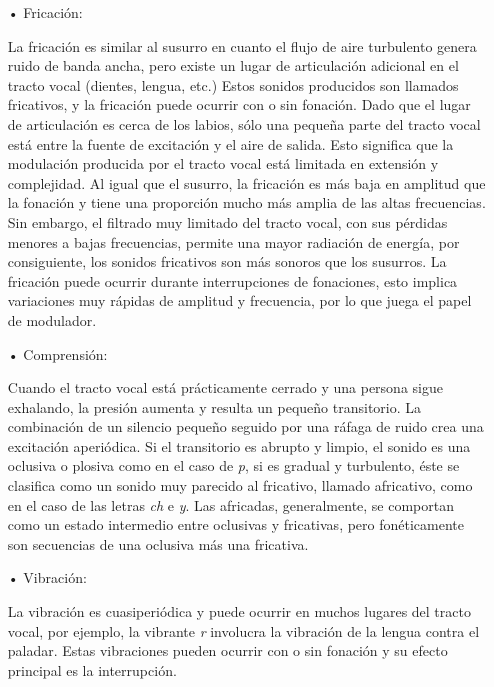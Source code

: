 \begin{enumerate}
\begin{enumerate}
\item[•]Fricación:
\par
La fricación es similar al susurro en cuanto el flujo de aire turbulento genera ruido de banda ancha, pero existe un lugar de articulación adicional en el tracto vocal (dientes, lengua, etc.) Estos sonidos producidos son llamados fricativos, y la fricación puede ocurrir con o sin fonación.
\vskip 0.5cm
Dado que el lugar de articulación es cerca de los labios, sólo una pequeña parte del tracto vocal está entre la fuente de excitación y el aire de salida. Esto significa que la modulación producida por el tracto vocal está limitada en extensión y complejidad. Al igual que el susurro, la fricación es más baja en amplitud que la fonación y tiene una proporción mucho más amplia de las altas frecuencias. Sin embargo, el filtrado muy limitado del tracto vocal, con sus pérdidas menores a bajas frecuencias, permite una mayor radiación de energía, por consiguiente, los sonidos fricativos son más sonoros que los susurros. La fricación puede ocurrir durante interrupciones de fonaciones, esto implica variaciones muy rápidas de amplitud y frecuencia, por lo que juega el papel de modulador.

\item[•]Comprensión:
\par
Cuando el tracto vocal está prácticamente cerrado y una persona sigue exhalando, la presión aumenta y resulta un pequeño transitorio. La combinación de un silencio pequeño seguido por una ráfaga de ruido crea una excitación aperiódica. Si el transitorio es abrupto y limpio, el sonido es una oclusiva o plosiva como en el caso de \textit{p}, si es gradual y turbulento, éste se clasifica como un sonido muy parecido al fricativo, llamado africativo, como en el caso de las letras \textit{ch} e \textit{y}. Las africadas, generalmente, se comportan como un estado intermedio entre oclusivas y fricativas, pero fonéticamente son secuencias de una oclusiva más una fricativa.

\item[•]Vibración:
\par
La vibración es cuasiperiódica y puede ocurrir en muchos lugares del tracto vocal, por ejemplo, la vibrante \textit{r} involucra la vibración de la lengua contra el paladar. Estas vibraciones pueden ocurrir con o sin fonación y su efecto principal es la interrupción.
\end{enumerate}


\end{enumerate}
